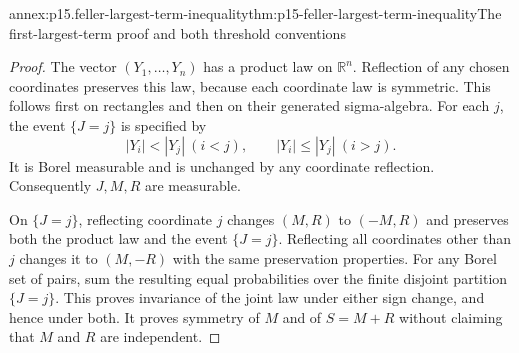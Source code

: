 \begin{annexitem}{annex:p15.feller-largest-term-inequality}{thm:p15-feller-largest-term-inequality}{The first-largest-term proof and both threshold conventions}
\begin{proof}
The vector \((Y_1,\ldots,Y_n)\) has a product law on
\(\mathbb R^n\). Reflection of any chosen coordinates preserves
this law, because each coordinate law is symmetric. This follows
first on rectangles and then on their generated sigma-algebra.
For each \(j\), the event \(\{J=j\}\) is specified by
\[
 |Y_i|<|Y_j|\ (i<j),\qquad |Y_i|\leq|Y_j|\ (i>j).
\]
It is Borel measurable and is unchanged by any coordinate reflection.
Consequently \(J,M,R\) are measurable.

On \(\{J=j\}\), reflecting coordinate \(j\) changes \((M,R)\)
to \((-M,R)\) and preserves both the product law and the event
\(\{J=j\}\). Reflecting all coordinates other than \(j\)
changes it to \((M,-R)\) with the same preservation properties.
For any Borel set of pairs, sum the resulting equal probabilities
over the finite disjoint partition \(\{J=j\}\).
This proves invariance of the joint law under either sign change,
and hence under both. It proves symmetry of \(M\) and of \(S=M+R\)
without claiming that \(M\) and \(R\) are independent.


\end{proof}
\end{annexitem}
